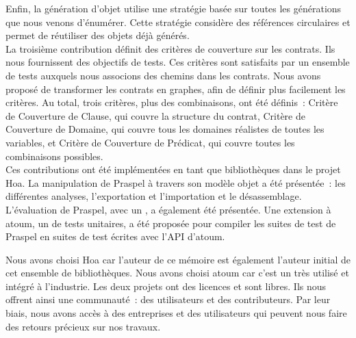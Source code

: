 Enfin, la génération d'objet utilise une stratégie basée sur toutes les
générations que nous venons d'énumérer. Cette stratégie considère des références
circulaires et permet de réutiliser des objets déjà générés. \\

La troisième contribution définit des critères de couverture sur les contrats.
Ils nous fournissent des objectifs de tests. Ces critères sont satisfaits par un
ensemble de tests auxquels nous associons des chemins dans les contrats. Nous
avons proposé de transformer les contrats en graphes, afin de définir plus
facilement les critères. Au total, trois critères, plus des combinaisons, ont
été définis~: Critère de Couverture de Clause, qui couvre la structure du
contrat, Critère de Couverture de Domaine, qui couvre tous les domaines
réalistes de toutes les variables, et Critère de Couverture de Prédicat, qui
couvre toutes les combinaisons possibles. \\

Ces contributions ont été implémentées en tant que bibliothèques dans le projet
Hoa. La manipulation de Praspel à travers son modèle objet a été présentée~: les
différentes analyses, l'exportation et l'importation et le désassemblage.
L'évaluation de Praspel, avec un , a
également été présentée. Une extension à atoum, un  de
tests unitaires, a été proposée pour compiler les suites de test de Praspel en
suites de test écrites avec l'API d'atoum.

Nous avons choisi Hoa car l'auteur de ce mémoire est également l'auteur initial
de cet ensemble de bibliothèques. Nous avons choisi atoum car c'est un
 très utilisé et intégré à l'industrie. Les deux projets
ont des licences  et sont libres. Ils nous offrent ainsi
une communauté~: des utilisateurs et des contributeurs. Par leur biais, nous
avons accès à des entreprises et des utilisateurs qui peuvent nous faire des
retours précieux sur nos travaux. \\

